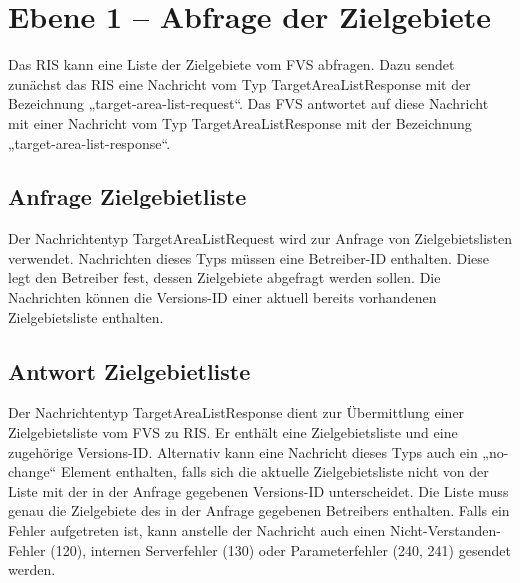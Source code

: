 \section{Ebene 1 -- Abfrage der Zielgebiete}
Das RIS kann eine Liste der Zielgebiete vom FVS abfragen. Dazu sendet zunächst das RIS eine Nachricht vom Typ TargetAreaListResponse mit der Bezeichnung „target-area-list-request“. Das FVS antwortet auf diese Nachricht mit einer Nachricht vom Typ TargetAreaListResponse mit der Bezeichnung „target-area-list-response“.



\subsection{Anfrage Zielgebietliste}
Der Nachrichtentyp TargetAreaListRequest wird zur Anfrage von Zielgebietslisten verwendet. Nachrichten dieses Typs müssen eine Betreiber-ID enthalten. Diese legt den Betreiber fest, dessen Zielgebiete abgefragt werden sollen. Die Nachrichten können die Versions-ID einer aktuell bereits vorhandenen Zielgebietsliste enthalten.



\subsection{Antwort Zielgebietliste}
Der Nachrichtentyp TargetAreaListResponse dient zur Übermittlung einer Zielgebietsliste vom FVS zu RIS. Er enthält eine Zielgebietsliste und eine zugehörige Versions-ID. Alternativ kann eine Nachricht dieses Typs auch ein „no-change“ Element enthalten, falls sich die aktuelle Zielgebietsliste nicht von der Liste mit der in der Anfrage gegebenen Versions-ID  unterscheidet. Die Liste muss genau die Zielgebiete des in der Anfrage gegebenen Betreibers enthalten. Falls ein Fehler aufgetreten ist, kann anstelle der Nachricht auch einen Nicht-Verstanden-Fehler (120), internen Serverfehler (130) oder Parameterfehler (240, 241) gesendet werden.




